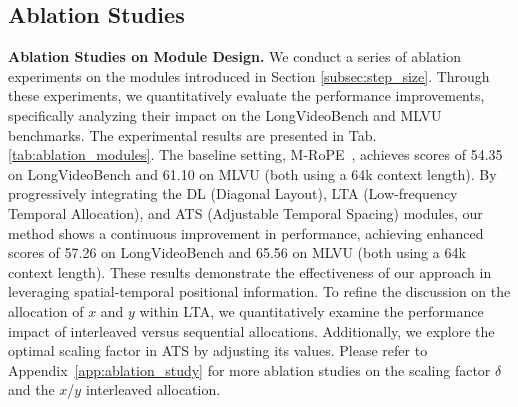 \subsection{Ablation Studies}
\noindent \textbf{Ablation Studies on Module Design.} 
We conduct a series of ablation experiments on the modules introduced in Section \ref{subsec:step_size}. Through these experiments, we quantitatively evaluate the performance improvements, specifically analyzing their impact on the LongVideoBench and MLVU benchmarks. The experimental results are presented in Tab. \ref{tab:ablation_modules}. The baseline setting, M-RoPE~\cite{wang2024qwen2}, achieves scores of 54.35 on LongVideoBench and 61.10 on MLVU (both using a 64k context length). By progressively integrating the DL (Diagonal Layout), LTA (Low-frequency Temporal Allocation), and ATS (Adjustable Temporal Spacing) modules, our method shows a continuous improvement in performance, achieving enhanced scores of 57.26 on LongVideoBench and 65.56 on MLVU (both using a 64k context length). These results demonstrate the effectiveness of our approach in leveraging spatial-temporal positional information. To refine the discussion on the allocation of \( x \) and \( y \) within LTA, we quantitatively examine the performance impact of interleaved versus sequential allocations. Additionally, we explore the optimal scaling factor in ATS by adjusting its values. Please refer to Appendix~\ref{app:ablation_study} for more ablation studies on the scaling factor $\delta$ and the $x$/$y$ interleaved allocation.



